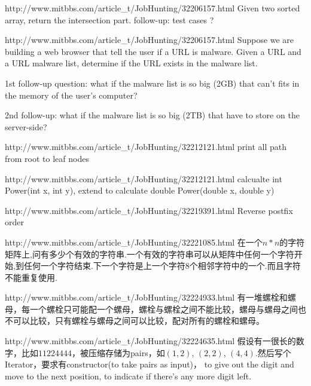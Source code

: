\documentclass[a4paper]{article}
\newcommand{\ilcode}[1]{
	\framebox[\width]{\texttt{#1}}
}
\begin{document}
\begin{CJK}{UTF8}{gbsn}
\begin{enumerate}
\begin{Q}[Google]{http://www.mitbbs.com/article_t/JobHunting/32206157.html}
Given two sorted array, return the intersection part. follow-up: test cases ?
\end{Q}

\begin{Q}[Google]{http://www.mitbbs.com/article_t/JobHunting/32206157.html}
Suppose we are building a web browser that tell the user if a URL is malware. Given a URL and a URL malware list, determine if the URL exists in the malware list.

1st follow-up question: what if the malware list is so big (2GB) that can't fits in the memory of the user's computer? 

2nd follow-up: what if the  malware list is so big (2TB) that have to store on the server-side?
\end{Q}

\begin{Q}[Facebook]{http://www.mitbbs.com/article_t/JobHunting/32212121.html}
print all path from root to leaf nodes
\end{Q}

\begin{Q}[Facebook]{http://www.mitbbs.com/article_t/JobHunting/32212121.html}
calcualte int Power(int x, int y), extend to calculate double Power(double x, double y)
\end{Q}

\begin{Q}[Linkedin]{http://www.mitbbs.com/article_t/JobHunting/32219391.html}
Reverse postfix order
\end{Q}

\begin{Q}[Google]{http://www.mitbbs.com/article_t/JobHunting/32221085.html}
在一个$n*n$的字符矩阵上,问有多少个有效的字符串.一个有效的字符串可以从矩阵中任何一个字符开始,到任何一个字符结束.下一个字符是上一个字符8个相邻字符中的一个.而且字符不能重复使用.
\end{Q}

\begin{Q}{http://www.mitbbs.com/article_t/JobHunting/32224933.html}
有一堆螺栓和螺母，每一个螺栓只可能配一个螺母，螺栓与螺栓之间不能比较，螺母与螺母之间也不可以比较，只有螺栓与螺母之间可以比较，配对所有的螺栓和螺母。
\end{Q}

\begin{Q}[Google]{http://www.mitbbs.com/article_t/JobHunting/32224635.html}
假设有一很长的数字，比如$11224444$，被压缩存储为pairs，如$(1, 2)$, $(2, 2)$, $(4, 4)$.然后写个Iterator，要求有constructor(to take pairs as input)，\ilcode{next()} to give out the digit and move to the next position, \ilcode{hasNext()} to indicate if there's any more digit left.
\end{Q}


\end{enumerate}
\end{CJK}
\end{document}
